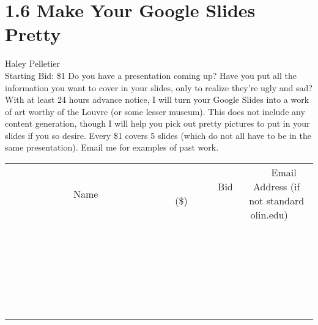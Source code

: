 \documentclass[11pt]{article}
\begin{document}
\section*{1.6 Make Your Google Slides Pretty}
Haley Pelletier
\\
Starting Bid: \$1
\newline
Do you have a presentation coming up? Have you put all the information you want to cover in your slides, only to realize they're ugly and sad? With at least 24 hours advance notice, I will turn your Google Slides into a work of art worthy of the Louvre (or some lesser museum). This does not include any content generation, though I will help you pick out pretty pictures to put in your slides if you so desire. Every \$1 covers 5 slides (which do not all have to be in the same presentation). Email me for examples of past work.
\\[6ex]
\begin{tabular}{c c c}
~~~~~~~~~~~~~Name~~~~~~~~~~~~~ & ~~~~~~~~~Bid (\$)~~~~~~~~~  & ~~~Email Address (if not standard olin.edu)~~~\\
 & & \\
\hline
 & & \\
\hline
 & & \\
\hline
 & & \\
\hline
 & & \\
\hline
 & & \\
\hline
 & & \\
\hline
 & & \\
\hline
 & & \\
\hline
 & & \\
\hline
 & & \\
\hline
 & & \\
\hline
 & & \\
\hline
 & & \\
\hline
 & & \\
\hline
 & & \\
\hline
 & & \\
\hline
 & & \\
\hline
 & & \\
\hline
 & & \\
\hline
 & & \\
\hline
 & & \\
\hline
 & & \\
\hline
 & & \\
\hline
 & & \\
\hline
 & & \\
\hline
\end{tabular}
\newpage
\end{document}
